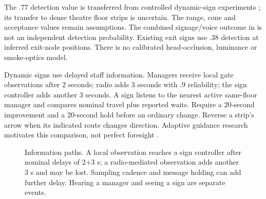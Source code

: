 \documentclass[11pt,a4paper]{article}
\begin{document}
The .77 detection value is transferred from controlled dynamic-sign experiments \cite{galea2014}; its transfer to dense theatre floor strips is uncertain. The range, cone and acceptance values remain assumptions. The combined signage/voice outcome in \cite{galea2017} is not an independent detection probability. Existing exit signs use .38 detection at inferred exit-node positions. There is no calibrated head-occlusion, luminance or smoke-optics model.

Dynamic signs use delayed staff information. Managers receive local gate observations after 2 seconds; radio adds 3 seconds with .9 reliability; the sign controller adds another 3 seconds. A sign listens to the nearest active same-floor manager and compares nominal travel plus reported waits. Require a 20-second improvement and a 20-second hold before an ordinary change. Reverse a strip's arrow when its indicated route changes direction. Adaptive guidance research motivates this comparison, not perfect foresight \cite{cellevac}.

\begin{figure}[htbp]\centering
{}
\caption{Information paths. A local observation reaches a sign controller after nominal delays of 2+3 s; a radio-mediated observation adds another 3 s and may be lost. Sampling cadence and message holding can add further delay. Hearing a manager and seeing a sign are separate events.}
\label{fig:information}
\end{figure}
\end{document}
